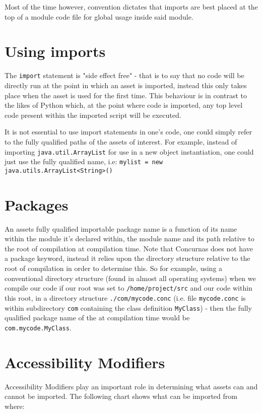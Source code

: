 \documentclass[conc-doc]{subfiles}
\begin{document}
Most of the time however, convention dictates that imports are best placed at the top of a module code file for global usage inside said module.

\section{Using imports}
The \lstinline{import} statement is "side effect free" - that is to say that no code will be directly run at the point in which an asset is imported, instead this only takes place when the asset is used for the first time. This behaviour is in contrast to the likes of Python which, at the point where code is imported, any top level code present within the imported script will be executed.

It is not essential to use import statements in one’s code, one could simply refer to the fully qualified paths of the assets of interest. For example, instead of importing \lstinline{java.util.ArrayList} for use in a new object instantiation, one could just use the fully qualified name, i.e: \lstinline{mylist = new java.utils.ArrayList<String>()}

\section{Packages}
An assets fully qualified importable package name is a function of its name within the module it’s declared within, the module name and its path relative to the root of compilation at compilation time. Note that Concurnas does not have a package keyword, instead it relies upon the directory structure relative to the root of compilation in order to determine this. So for example, using a conventional directory structure (found in almost all operating systems) when we compile our code if our root was set to \lstinline{/home/project/src} and our code within this root, in a directory structure \lstinline{./com/mycode.conc} (i.e. file \lstinline{mycode.conc} is within subdirectory \lstinline{com} containing the class definition \lstinline{MyClass}) - then the fully qualified package name of the at compilation time would be \lstinline{com.mycode.MyClass}.

\section{Accessibility Modifiers}
Accessibility Modifiers play an important role in determining what assets can and cannot be imported. The following chart shows what can be imported from where:
\end{document}
